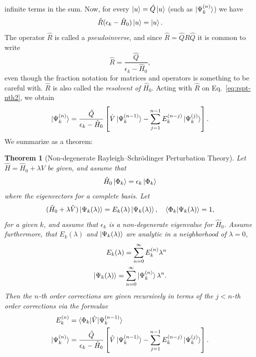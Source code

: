 \documentclass{report}
\theoremstyle{plain}
\newtheorem{theorem}{Theorem}[chapter]
\theoremstyle{definition}
\begin{document}
infinite terms in the sum. Now,
for every $\ket{u} = \hat{Q}\ket{u}$ (such as
$\ket{\Psi_k^{(n)}}$) we have
\begin{equation}
  \hat{R} (\epsilon_k - \hat{H}_0)\ket{u} = \ket{u}.
\end{equation}
The operator $\hat{R}$ is called a \emph{pseudoinverse}, and since
$\hat{R} = \hat{Q} \hat{R}\hat{Q}$ it is
common to write
\begin{equation}
  \hat{R} = \frac{\hat{Q}}{\epsilon_k - \hat{H}_0},
\end{equation}
even though the fraction notation for matrices and operators is 
something to be careful with. $\hat{R}$ is also called the
\emph{resolvent of $\hat{H}_0$}.
Acting with
$\hat{R}$ on Eq.~\eqref{eq:rspt-nth2}, we obtain
\begin{equation}
  \ket{\Psi_k^{(n)}} = \frac{\hat{Q}}{\epsilon_k - \hat{H}_0 } \left[
    \hat{V} \ket{\Psi_k^{(n-1)}} - \sum_{j=1}^{n-1} E_k^{(n-j)}
    \ket{\Psi_k^{(j)}} \right].
\end{equation}
We summarize as a theorem:
\begin{theorem}[Non-degenerate Rayleigh--Schr\"odinger Perturbation Theory]
  \label{thm:rspt}
  Let $\hat{H} = \hat{H}_0 + \lambda \hat{V}$ be given, and assume
  that
  \begin{equation}
    \hat{H}_0 \ket{\Phi_k} = \epsilon_k \ket{\Phi_k}
  \end{equation}
  where the eigenvectors for a complete basis. Let
  \begin{equation}
    (\hat{H}_0 + \lambda \hat{V}) \ket{\Psi_k(\lambda)} = E_k(\lambda)
    \ket{\Psi_k(\lambda)}, \quad \braket{\Phi_k|\Psi_k(\lambda)} = 1,
  \end{equation}
  for a given $k$, and assume that $\epsilon_k$ is a non-degenerate
  eigenvalue for $\hat{H}_0$. Assume furthermore, that $E_k(\lambda)$
  and $\ket{\Psi_k(\lambda)}$ are analytic in a neighborhood of
  $\lambda = 0$,
  \begin{align}
    E_k(\lambda) = \sum_{n=0}^\infty E_k^{(n)}\lambda^n\\
    \ket{\Psi_k(\lambda)} = \sum_{n=0}^\infty \ket{\Psi_k^{(n)}}\lambda^n.
  \end{align}
  Then the $n$-th order corrections are given recursively in terms
  of the $j<n$-th order corrections via the formulae
  \begin{align}
    E_k^{(n)} &= \braket{\Phi_k|\hat{V}|\Psi_k^{(n-1)}} \\
    \ket{\Psi_k^{(n)}} &=  \frac{\hat{Q}}{\epsilon_k - \hat{H}_0} \left[
      \hat{V} \ket{\Psi_k^{(n-1)}} - \sum_{j=1}^{n-1} E_k^{(n-j)}
      \ket{\Psi_k^{(j)}} \right].
  \end{align}
\end{theorem}
\end{document}

